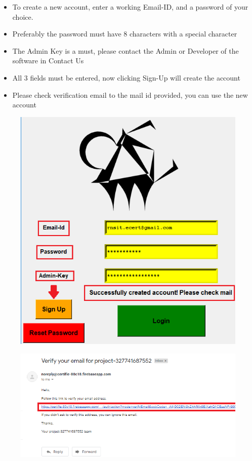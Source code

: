 \begin{itemize}
	\item To create a new account, enter a working Email-ID, and a password of your choice.
	\item Preferably the password must have 8 characters with a special character
	\item The Admin Key is a must, please contact the Admin or Developer of the software in Contact Us
	\item All 3 fields must be entered, now clicking Sign-Up will create the account
	\item Please check verification email to the mail id provided, you can use the new account
\end{itemize}
\begin{figure}[H]
	\centering
	\includegraphics[width=0.6\linewidth]{images/login_page/login_4}
	\label{fig:login4}
\end{figure}

\begin{figure}[H]
	\centering
	\includegraphics[width=0.9\linewidth]{images/login_page/login_6}
	\label{fig:login6}
\end{figure}

